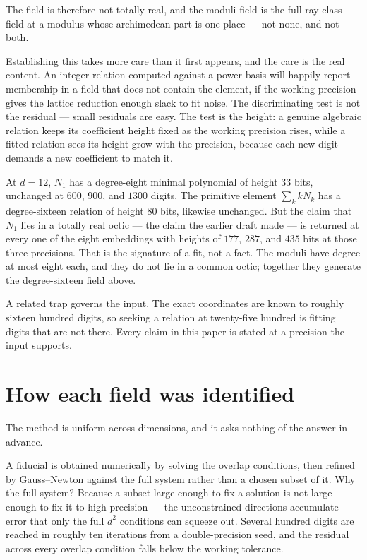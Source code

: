 \documentclass[12pt,a4paper]{article}
\begin{document}
The field is therefore not totally real, and the moduli field is the full ray class field at a modulus whose archimedean part is one place — not none, and not both.

Establishing this takes more care than it first appears, and the care is the real content. An integer relation computed against a power basis will happily report membership in a field that does not contain the element, if the working precision gives the lattice reduction enough slack to fit noise. The discriminating test is not the residual — small residuals are easy. The test is the height: a genuine algebraic relation keeps its coefficient height fixed as the working precision rises, while a fitted relation sees its height grow with the precision, because each new digit demands a new coefficient to match it.

At $d=12$, $N_1$ has a degree-eight minimal polynomial of height $33$ bits, unchanged at $600$, $900$, and $1300$ digits. The primitive element $\sum_k k N_k$ has a degree-sixteen relation of height $80$ bits, likewise unchanged. But the claim that $N_1$ lies in a totally real octic — the claim the earlier draft made — is returned at every one of the eight embeddings with heights of $177$, $287$, and $435$ bits at those three precisions. That is the signature of a fit, not a fact. The moduli have degree at most eight each, and they do not lie in a common octic; together they generate the degree-sixteen field above.

A related trap governs the input. The exact coordinates are known to roughly sixteen hundred digits, so seeking a relation at twenty-five hundred is fitting digits that are not there. Every claim in this paper is stated at a precision the input supports.

\section{How each field was identified}
\label{sec:method}

The method is uniform across dimensions, and it asks nothing of the answer in advance.

A fiducial is obtained numerically by solving the overlap conditions, then refined by Gauss--Newton against the full system rather than a chosen subset of it. Why the full system? Because a subset large enough to fix a solution is not large enough to fix it to high precision — the unconstrained directions accumulate error that only the full $d^2$ conditions can squeeze out. Several hundred digits are reached in roughly ten iterations from a double-precision seed, and the residual across every overlap condition falls below the working tolerance.
\end{document}
